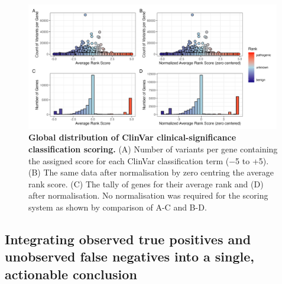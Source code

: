 \begin{figure}[h]
  \centering
  \includegraphics[width=0.99\textwidth]{../images/p_gene_summary_hist_patch3.png}
\caption{\textbf{Global distribution of ClinVar clinical-significance classification scoring.} 
(A) Number of variants per gene containing the assigned score for each ClinVar classification term (−5 to +5). 
(B) The same data after normalisation by zero centring the average rank score.
(C) The tally of genes for their average rank and (D) after normalisation. No normalisation was required for the scoring system as shown by comparison of A-C and B-D.}
  \label{fig:p_gene_summary_hist_patch3}
\end{figure}

\clearpage
\subsection{Integrating observed true positives and unobserved false negatives into a single, actionable conclusion}

%
%
%
%
%

